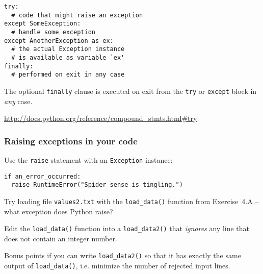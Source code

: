 \documentclass[english,serif,mathserif,xcolor=pdftex,dvipsnames,table]{beamer}
\begin{document}
\begin{frame}[fragile]
\begin{lstlisting}
try:
  # code that might raise an exception
except SomeException:
  # handle some exception
except AnotherException as ex:
  # the actual Exception instance
  # is available as variable `ex'
finally:
  # performed on exit in any case
\end{lstlisting}

  \+
  The optional \lstinline|finally| clause is executed on exit from the
  \lstinline|try| or \lstinline|except| block in \emph{any} case.

  \begin{references}
    \scriptsize
    \url{http://docs.python.org/reference/compound_stmts.html#try}
\end{references}
\end{frame}


\begin{frame}[fragile]
  \frametitle{Raising exceptions in your code}
  Use the \lstinline|raise| statement with an \texttt{Exception}
  instance:
\begin{lstlisting}
if an_error_occurred:
  raise RuntimeError("Spider sense is tingling.")
\end{lstlisting}
\end{frame}


\begin{frame}
  \begin{exercise*}[5.A]
    Try loading file \texttt{values2.txt} with the \lstinline`load_data()`
    function from Exercise~4.A -- what exception does Python raise?

    \+
    Edit the \lstinline`load_data()` function into a \lstinline`load_data2()`
    that \emph{ignores} any line that does not contain an integer number.

    \+
    Bonus points if you can write \lstinline`load_data2()` so that it has
    exactly the same output of \lstinline`load_data()`, i.e. minimize the number
    of rejected input lines.
  \end{exercise*}
\end{frame}
\end{document}
